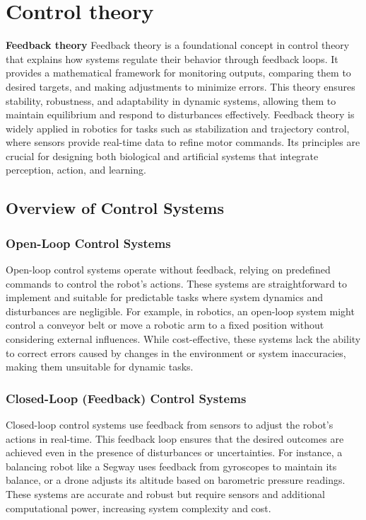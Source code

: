 \chapter{Control theory}
\textbf{Feedback theory}
Feedback theory is a foundational concept in control theory that explains how systems regulate their behavior through feedback loops. It provides a mathematical framework for monitoring outputs, comparing them to desired targets, and making adjustments to minimize errors. This theory ensures stability, robustness, and adaptability in dynamic systems, allowing them to maintain equilibrium and respond to disturbances effectively. Feedback theory is widely applied in robotics for tasks such as stabilization and trajectory control, where sensors provide real-time data to refine motor commands. Its principles are crucial for designing both biological and artificial systems that integrate perception, action, and learning. \cite{sutton-2018-reinforcement-learning} \cite{rao-1999-predictive-coding}


\section{Overview of Control Systems}

\subsection{Open-Loop Control Systems}
Open-loop control systems operate without feedback, relying on predefined commands to control the robot's actions. These systems are straightforward to implement and suitable for predictable tasks where system dynamics and disturbances are negligible. For example, in robotics, an open-loop system might control a conveyor belt or move a robotic arm to a fixed position without considering external influences. While cost-effective, these systems lack the ability to correct errors caused by changes in the environment or system inaccuracies, making them unsuitable for dynamic tasks.

\subsection{Closed-Loop (Feedback) Control Systems}
Closed-loop control systems use feedback from sensors to adjust the robot's actions in real-time. This feedback loop ensures that the desired outcomes are achieved even in the presence of disturbances or uncertainties. For instance, a balancing robot like a Segway uses feedback from gyroscopes to maintain its balance, or a drone adjusts its altitude based on barometric pressure readings. These systems are accurate and robust but require sensors and additional computational power, increasing system complexity and cost.

